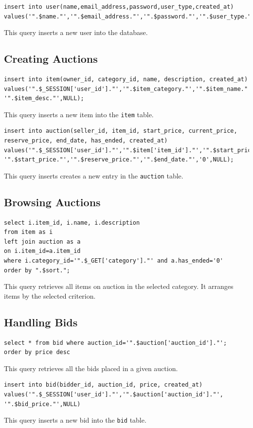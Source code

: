 \documentclass{article}
\begin{document}
\begin{verbatim}
insert into user(name,email_address,password,user_type,created_at)
values('".$name."','".$email_address."','".$password."','".$user_type."',NULL);
\end{verbatim}
This query inserts a new user into the database.

\subsection{Creating Auctions}
\begin{verbatim}
insert into item(owner_id, category_id, name, description, created_at)
values('".$_SESSION['user_id']."','".$item_category."','".$item_name."',
'".$item_desc."',NULL);
\end{verbatim}
This query inserts a new item into the \texttt{item} table.

\begin{verbatim}
insert into auction(seller_id, item_id, start_price, current_price,
reserve_price, end_date, has_ended, created_at)
values('".$_SESSION['user_id']."','".$item['item_id']."','".$start_price."',
'".$start_price."','".$reserve_price."','".$end_date."','0',NULL);
\end{verbatim}
This query inserts creates a new entry in the \texttt{auction} table.

\subsection{Browsing Auctions}
\begin{verbatim}
select i.item_id, i.name, i.description
from item as i
left join auction as a
on i.item_id=a.item_id
where i.category_id='".$_GET['category']."' and a.has_ended='0'
order by ".$sort.";
\end{verbatim}
This query retrieves all items on auction in the selected category. It arranges items by the selected criterion.

\subsection{Handling Bids}
\begin{verbatim}
select * from bid where auction_id='".$auction['auction_id']."';
order by price desc
\end{verbatim}
This query retrieves all the bids placed in a given auction.

\begin{verbatim}
insert into bid(bidder_id, auction_id, price, created_at)
values('".$_SESSION['user_id']."','".$auction['auction_id']."',
'".$bid_price."',NULL)
\end{verbatim}
This query inserts a new bid into the \texttt{bid} table.
\end{document}
